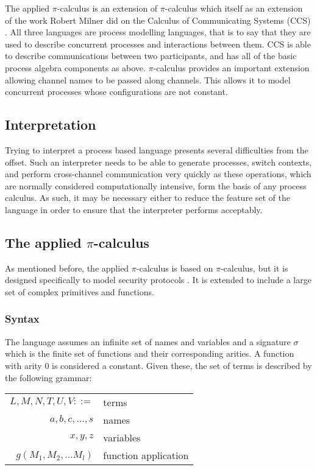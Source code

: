 The applied $\pi$-calculus \cite{af01} is an extension of $\pi$-calculus \cite{mpw92} which itself as an extension of the work Robert Milner did on the Calculus of Communicating Systems (CCS) \cite{m82}. All three languages are process modelling languages, that is to say that they are used to describe concurrent processes and interactions between them. 
CCS is able to describe communications between two participants, and has all of the basic process algebra components as above. 
$\pi$-calculus provides an important extension allowing channel names to be passed along channels. This allows it to model concurrent processes whose configurations are not constant.

\subsection{Interpretation}

Trying to interpret a process based language presents several difficulties from the offset. Such an interpreter needs to be able to generate processes, switch contexts, and perform cross-channel communication very quickly as these operations, which are normally considered computationally intensive, form the basis of any process calculus. \cite{pt97} 
As such, it may be necessary either to reduce the feature set of the language in order to ensure that the interpreter performs acceptably. 

\subsection{The applied $\pi$-calculus}

As mentioned before, the applied $\pi$-calculus is based on $\pi$-calculus, but it is designed specifically to model security protocols \cite{rs13}. It is extended to include a large set of complex primitives and functions.
\subsubsection{Syntax}

The language assumes an infinite set of names and variables and a signature $\sigma$ which is the finite set of functions and their corresponding arities\cite{af01}. A function with arity 0 is considered a constant. Given these, the set of terms is described by the following grammar:
\begin{table}[hc!]
    \begin{tabular}{r l}
        $L,M,N,T,U,V ::=$ & terms \\
        $a,b,c,...,s$ & names\\
        $x,y,z$ & variables\\
        $g(M_{1},M_{2},...M_{l})$ & function application \\
    \end{tabular}
\end{table}

